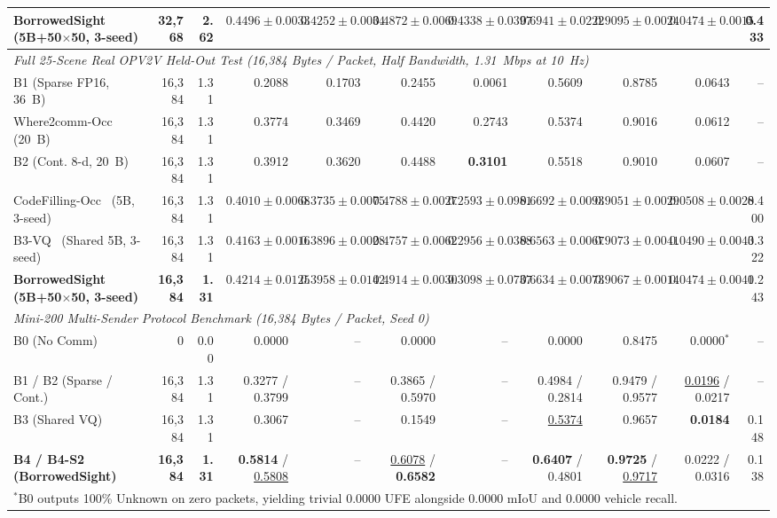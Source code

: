 \documentclass[journal]{IEEEtran}
\begin{document}
\begin{table}[!tbp]
{\begin{tabular}{lrrrrrrrrrr}
\rowcolor{oursrow}
\textbf{BorrowedSight (5B+50$\times$50, 3-seed)} & \textbf{32,768} & \textbf{2.62} & {\boldmath$0.4496 \pm 0.0033$} & {\boldmath$0.4252 \pm 0.0034$} & {\boldmath$0.4872 \pm 0.0069$} & {\boldmath$0.4338 \pm 0.0397$} & $0.6941 \pm 0.0222$ & \underline{$0.9095 \pm 0.0024$} & $0.0474 \pm 0.0015$ & 0.433 \\
\midrule
\multicolumn{11}{l}{\textit{Full 25-Scene Real OPV2V Held-Out Test (16,384 Bytes / Packet, Half Bandwidth, 1.31~Mbps at 10~Hz)}} \\
B1 (Sparse FP16, 36~B) & 16,384 & 1.31 & 0.2088 & 0.1703 & 0.2455 & 0.0061 & 0.5609 & 0.8785 & 0.0643 & -- \\
Where2comm-Occ~\cite{hu2022where2comm} (20~B) & 16,384 & 1.31 & 0.3774 & 0.3469 & 0.4420 & 0.2743 & 0.5374 & 0.9016 & 0.0612 & -- \\
B2 (Cont. 8-d, 20~B) & 16,384 & 1.31 & 0.3912 & 0.3620 & 0.4488 & \textbf{0.3101} & 0.5518 & 0.9010 & 0.0607 & -- \\
CodeFilling-Occ~\cite{hu2024codefilling} (5B, 3-seed) & 16,384 & 1.31 & $0.4010 \pm 0.0068$ & $0.3735 \pm 0.0075$ & \underline{$0.4788 \pm 0.0027$} & $0.2593 \pm 0.0981$ & {\boldmath$0.6692 \pm 0.0093$} & $0.9051 \pm 0.0029$ & $0.0508 \pm 0.0028$ & 0.400 \\
B3-VQ~\cite{li2026vqsop} (Shared 5B, 3-seed) & 16,384 & 1.31 & \underline{$0.4163 \pm 0.0016$} & \underline{$0.3896 \pm 0.0028$} & $0.4757 \pm 0.0062$ & $0.2956 \pm 0.0388$ & $0.6563 \pm 0.0067$ & {\boldmath$0.9073 \pm 0.0041$} & \underline{$0.0490 \pm 0.0043$} & 0.322 \\
\rowcolor{oursrow}
\textbf{BorrowedSight (5B+50$\times$50, 3-seed)} & \textbf{16,384} & \textbf{1.31} & {\boldmath$0.4214 \pm 0.0125$} & {\boldmath$0.3958 \pm 0.0142$} & {\boldmath$0.4914 \pm 0.0030$} & \underline{$0.3098 \pm 0.0737$} & \underline{$0.6634 \pm 0.0073$} & \underline{$0.9067 \pm 0.0014$} & {\boldmath$0.0474 \pm 0.0041$} & 0.243 \\
\midrule
\multicolumn{11}{l}{\textit{Mini-200 Multi-Sender Protocol Benchmark (16,384 Bytes / Packet, Seed 0)}} \\
B0 (No Comm) & 0 & 0.00 & 0.0000 & -- & 0.0000 & -- & 0.0000 & 0.8475 & 0.0000$^*$ & -- \\
B1 / B2 (Sparse / Cont.) & 16,384 & 1.31 & 0.3277 / 0.3799 & -- & 0.3865 / 0.5970 & -- & 0.4984 / 0.2814 & 0.9479 / 0.9577 & \underline{0.0196} / 0.0217 & -- \\
B3 (Shared VQ) & 16,384 & 1.31 & 0.3067 & -- & 0.1549 & -- & \underline{0.5374} & 0.9657 & \textbf{0.0184} & 0.148 \\
\rowcolor{oursrow}
\textbf{B4 / B4-S2 (BorrowedSight)} & \textbf{16,384} & \textbf{1.31} & \textbf{0.5814} / \underline{0.5808} & -- & \underline{0.6078} / \textbf{0.6582} & -- & \textbf{0.6407} / 0.4801 & \textbf{0.9725} / \underline{0.9717} & 0.0222 / 0.0316 & 0.138 \\
\bottomrule
\multicolumn{11}{l}{\footnotesize $^*$B0 outputs 100\% Unknown on zero packets, yielding trivial 0.0000 UFE alongside 0.0000 mIoU and 0.0000 vehicle recall.}
\end{tabular}}
\end{table}
\end{document}

